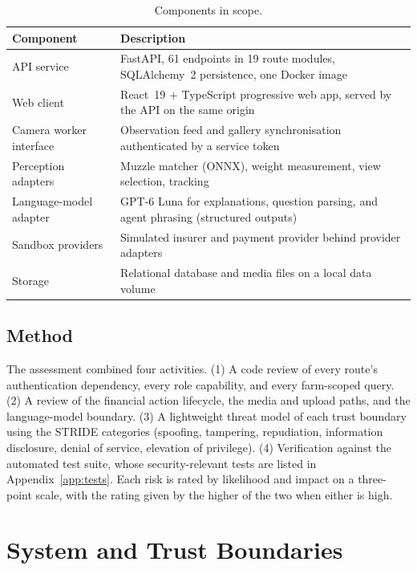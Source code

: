 \documentclass[11pt,letterpaper]{article}
\begin{document}
\begin{table}[H]
\centering
\caption{Components in scope.}
\label{tab:scope}
\small
\begin{tabularx}{\textwidth}{>{\raggedright\arraybackslash}p{3.6cm}X}
\toprule
Component & Description \\
\midrule
API service & FastAPI, 61 endpoints in 19 route modules, SQLAlchemy~2 persistence, one Docker image \\
Web client & React~19 + TypeScript progressive web app, served by the API on the same origin \\
Camera worker interface & Observation feed and gallery synchronisation authenticated by a service token \\
Perception adapters & Muzzle matcher (ONNX), weight measurement, view selection, tracking \\
Language-model adapter & GPT-6 Luna for explanations, question parsing, and agent phrasing (structured outputs) \\
Sandbox providers & Simulated insurer and payment provider behind provider adapters \\
Storage & Relational database and media files on a local data volume \\
\bottomrule
\end{tabularx}
\end{table}

\subsection{Method}

The assessment combined four activities. (1) A code review of every route's authentication dependency, every role capability, and every farm-scoped query. (2) A review of the financial action lifecycle, the media and upload paths, and the language-model boundary. (3) A lightweight threat model of each trust boundary using the STRIDE categories (spoofing, tampering, repudiation, information disclosure, denial of service, elevation of privilege). (4) Verification against the automated test suite, whose security-relevant tests are listed in Appendix~\ref{app:tests}. Each risk is rated by likelihood and impact on a three-point scale, with the rating given by the higher of the two when either is high.

\section{System and Trust Boundaries}
\end{document}
